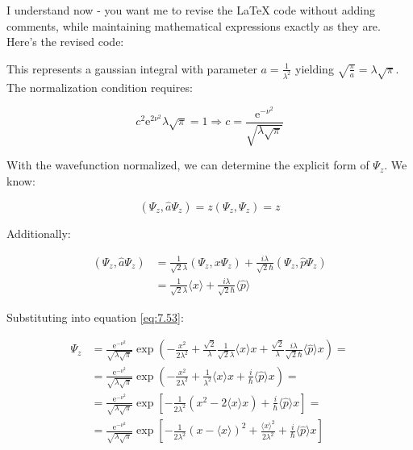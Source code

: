 \documentclass[italian]{HKNdocument}
\begin{document}
I understand now - you want me to revise the LaTeX code without adding comments, while maintaining mathematical expressions exactly as they are. Here's the revised code:


This represents a gaussian integral with parameter $a=\frac{1}{\lambda^{2}}$ yielding $\sqrt{\frac{\pi}{a}}=\lambda \sqrt{\pi}$. The normalization condition requires:

\begin{equation}
c^{2} \mathrm{e}^{2 \nu^{2}} \lambda \sqrt{\pi}=1 \Longrightarrow c=\frac{\mathrm{e}^{-\nu^{2}}}{\sqrt{\lambda \sqrt{\pi}}}
\end{equation}

With the wavefunction normalized, we can determine the explicit form of $\Psi_{z}$. We know:

\begin{equation}
\left(\Psi_{z}, \hat{a} \Psi_{z}\right)=z\left(\Psi_{z}, \Psi_{z}\right)=z
\end{equation}

Additionally:

\begin{align}
\left(\Psi_{z}, \hat{a} \Psi_{z}\right) & =\frac{1}{\sqrt{2} \lambda}\left(\Psi_{z}, x \Psi_{z}\right)+\frac{i \lambda}{\sqrt{2} \hbar}\left(\Psi_{z}, \hat{p} \Psi_{z}\right)  \\
& =\frac{1}{\sqrt{2} \lambda}\langle x\rangle+\frac{i \lambda}{\sqrt{2} \hbar}\langle\hat{p}\rangle
\end{align}

Substituting into equation \eqref{eq:7.53}:

\begin{align}
\Psi_{z} & =\frac{\mathrm{e}^{-\nu^{2}}}{\sqrt{\lambda \sqrt{\pi}}} \exp \left(-\frac{x^{2}}{2 \lambda^{2}}+\frac{\sqrt{2}}{\lambda} \frac{1}{\sqrt{2} \lambda}\langle x\rangle x+\frac{\sqrt{2}}{\lambda} \frac{i \lambda}{\sqrt{2} \hbar}\langle\hat{p}\rangle x\right)= \\
& =\frac{\mathrm{e}^{-\nu^{2}}}{\sqrt{\lambda \sqrt{\pi}}} \exp \left(-\frac{x^{2}}{2 \lambda^{2}}+\frac{1}{\lambda^{2}}\langle x\rangle x+\frac{i}{\hbar}\langle\hat{p}\rangle x\right)= \\
& =\frac{\mathrm{e}^{-\nu^{2}}}{\sqrt{\lambda \sqrt{\pi}}} \exp \left[-\frac{1}{2 \lambda^{2}}\left(x^{2}-2\langle x\rangle x\right)+\frac{i}{\hbar}\langle\hat{p}\rangle x\right]=  \label{eq:7.61}\\
& =\frac{\mathrm{e}^{-\nu^{2}}}{\sqrt{\lambda \sqrt{\pi}}} \exp \left[-\frac{1}{2 \lambda^{2}}(x-\langle x\rangle)^{2}+\frac{\langle x\rangle^{2}}{2 \lambda^{2}}+\frac{i}{\hbar}\langle\hat{p}\rangle x\right]
\end{align}
\end{document}

